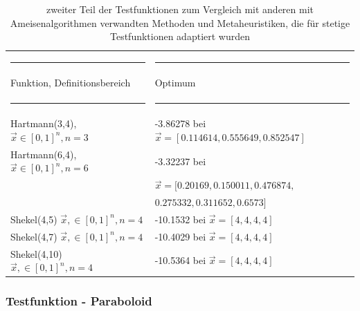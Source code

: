 \documentclass[fontsize=12, a4aper]{scrartcl}
\newcommand\Tstrut{\rule{0pt}{3ex}}           %
\begin{document}
	\begin{table}[H]
		
		\fontsize{10pt}{12pt}
		
		\caption{zweiter Teil der Testfunktionen zum Vergleich mit anderen mit Ameisenalgorithmen verwandten Methoden und Metaheuristiken, die für stetige Testfunktionen adaptiert wurden}
		
		\label{subsec:Stetige_Testfunktionen:tab:Teil_2_2_Stet_Adapt}
		
		\begin{tabularx}{\textwidth}{l|l}
			
			\rule{6.4cm}{0.4pt} & \rule{8cm}{0.4pt}\\
			
			Funktion, Definitionsbereich & Optimum\\
			
			\rule{6.4cm}{0.4pt} & \rule{8cm}{0.4pt}\\
			
			Hartmann(3,4), \(\overrightarrow{x} \in [0,1]^n, n=3\) & -3.86278 bei \(\overrightarrow{x} = [0.114614, 0.555649, 0.852547]\)\\
			
			Hartmann(6,4), \(\overrightarrow{x} \in [0,1]^n, n=6\) & -3.32237 bei\Tstrut\\
			& \(\overrightarrow{x} = [0.20169, 0.150011, 0.476874,\)\\
			& \(0.275332, 0.311652, 0.6573]\) \\
			
			Shekel(4,5) \(\overrightarrow{x}, \in [0,1]^n, n = 4\) & -10.1532 bei \(\overrightarrow{x} = [4, 4 , 4, 4]\)\Tstrut\\
			
			Shekel(4,7) \(\overrightarrow{x}, \in [0,1]^n, n = 4\) & -10.4029 bei \(\overrightarrow{x} = [4, 4 , 4, 4]\)\Tstrut\\ 
			
			Shekel(4,10) \(\overrightarrow{x}, \in [0,1]^n, n = 4\) & -10.5364 bei \(\overrightarrow{x} = [4, 4 , 4, 4]\)\Tstrut\\
			
		\end{tabularx}
		
	\end{table}
	
	\subsubsection{Testfunktion - Paraboloid} \label{subsubsec:Stetige_Testfunktionen:Testfunktion_-_Paraboloid}
	
\end{document}

